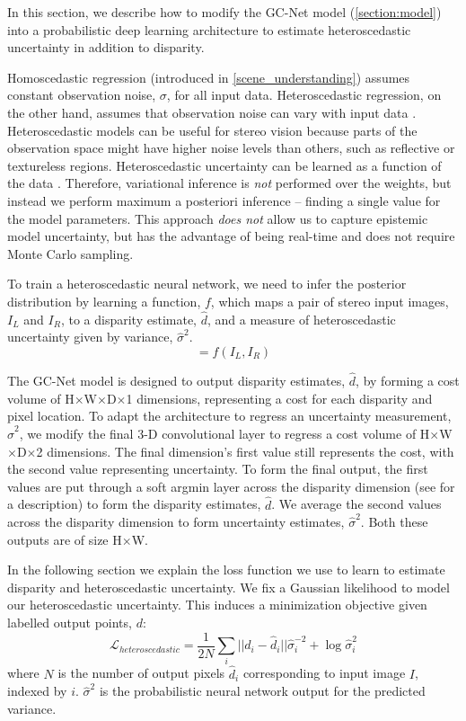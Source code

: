 In this section, we describe how to modify the GC-Net model (\cref{section:model}) into a probabilistic deep learning architecture to estimate heteroscedastic uncertainty in addition to disparity.

Homoscedastic regression (introduced in \cref{scene_understanding}) assumes constant observation noise, $\sigma$, for all input data. Heteroscedastic regression, on the other hand, assumes that observation noise can vary with input data \citep{nix1994estimating,le2005heteroscedastic}. Heteroscedastic models can be useful for stereo vision because parts of the observation space might have higher noise levels than others, such as reflective or textureless regions. Heteroscedastic uncertainty can be learned as a function of the data \citep{kendall2017uncertainties}. Therefore, variational inference is \textit{not} performed over the weights, but instead we perform maximum a posteriori inference -- finding a single value for the model parameters. This approach \textit{does not} allow us to capture epistemic model uncertainty, but has the advantage of being real-time and does not require Monte Carlo sampling.

To train a heteroscedastic neural network, we need to infer the posterior distribution by learning a function, $f$, which maps a pair of stereo input images, $I_{L}$ and $I_{R}$, to a disparity estimate, $\hat{d}$, and a measure of heteroscedastic uncertainty given by variance, $\hat{\sigma}^2$. 
\begin{equation}
[\hat{d}, \hat{\sigma}^2] = f(I_{L}, I_{R})
\end{equation}

The GC-Net model is designed to output disparity estimates, $\hat{d}$, by forming a cost volume of H$\times$W$\times$D$\times$1 dimensions, representing a cost for each disparity and pixel location. To adapt the architecture to regress an uncertainty measurement, $\hat{\sigma}^2$, we modify the final 3-D convolutional layer to regress a cost volume of H$\times$W$\times$D$\times$2 dimensions. The final dimension's first value still represents the cost, with the second value representing uncertainty. To form the final output, the first values are put through a soft argmin layer across the disparity dimension (see \citep{kendall2017end} for a description) to form the disparity estimates, $\hat{d}$. We average the second values across the disparity dimension to form uncertainty estimates, $\hat{\sigma}^2$. Both these outputs are of size H$\times$W.

In the following section we explain the loss function we use to learn to estimate disparity and heteroscedastic uncertainty. We fix a Gaussian likelihood to model our heteroscedastic uncertainty. This induces a minimization objective \citep{nix1994estimating} given labelled output points, $d$:
\begin{equation}
\mathcal{L}_{heteroscedastic} = \frac{1}{2N} \sum_i ||d_i-\hat{d}_i||\hat{\sigma}^{-2}_i + \log{\hat{\sigma}^2_i}
\label{eqn:bayes_loss}
\end{equation}
where $N$ is the number of output pixels $\hat{d}_i$ corresponding to input image $I$, indexed by $i$. $\hat{\sigma}^2$ is the probabilistic neural network output for the predicted variance.

